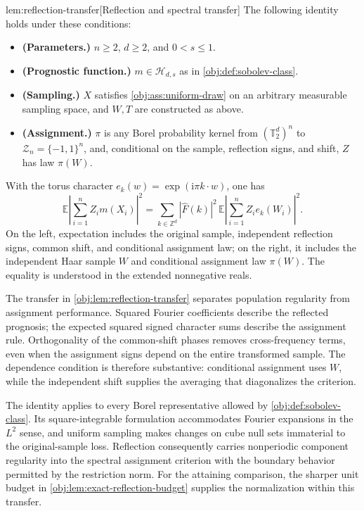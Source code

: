 \begin{lemmav}{lem:reflection-transfer}[Reflection and spectral transfer]
The following identity holds under these conditions:
\begin{itemize}
\item \textbf{(Parameters.)} \(n\geq2\), \(d\geq2\), and \(0<s\leq1\).
\item \textbf{(Prognostic function.)} \(m\in\mathcal H_{d,s}\) as in \cref{obj:def:sobolev-class}.
\item \textbf{(Sampling.)} \(X\) satisfies \cref{obj:ass:uniform-draw} on an arbitrary measurable sampling space, and \(W,T\) are constructed as above.
\item \textbf{(Assignment.)} \(\pi\) is any Borel probability kernel from \((\mathbb T_2^d)^n\) to \(\mathcal Z_n=\{-1,1\}^n\), and, conditional on the sample, reflection signs, and shift, \(Z\) has law \(\pi(W)\).
\end{itemize}
With the torus character \(e_k(w)=\exp(\mathrm i\pi k\cdot w)\), one has
\[
\mathbb E\left|\sum_{i=1}^n Z_i m(X_i)\right|^2
=
\sum_{k\in\mathbb Z^d}
|\widehat F(k)|^2\,
\mathbb E\left|\sum_{i=1}^n Z_i e_k(W_i)\right|^2.
\]
On the left, expectation includes the original sample, independent reflection signs, common shift, and conditional assignment law; on the right, it includes the independent Haar sample \(W\) and conditional assignment law \(\pi(W)\). The equality is understood in the extended nonnegative reals.
\end{lemmav}

The transfer in \cref{obj:lem:reflection-transfer} separates population regularity from assignment performance. Squared Fourier coefficients describe the reflected prognosis; the expected squared signed character sums describe the assignment rule. Orthogonality of the common-shift phases removes cross-frequency terms, even when the assignment signs depend on the entire transformed sample. The dependence condition is therefore substantive: conditional assignment uses \(W\), while the independent shift supplies the averaging that diagonalizes the criterion.

The identity applies to every Borel representative allowed by \cref{obj:def:sobolev-class}. Its square-integrable formulation accommodates Fourier expansions in the \(L^2\) sense, and uniform sampling makes changes on cube null sets immaterial to the original-sample loss. Reflection consequently carries nonperiodic component regularity into the spectral assignment criterion with the boundary behavior permitted by the restriction norm. For the attaining comparison, the sharper unit budget in \cref{obj:lem:exact-reflection-budget} supplies the normalization within this transfer.


